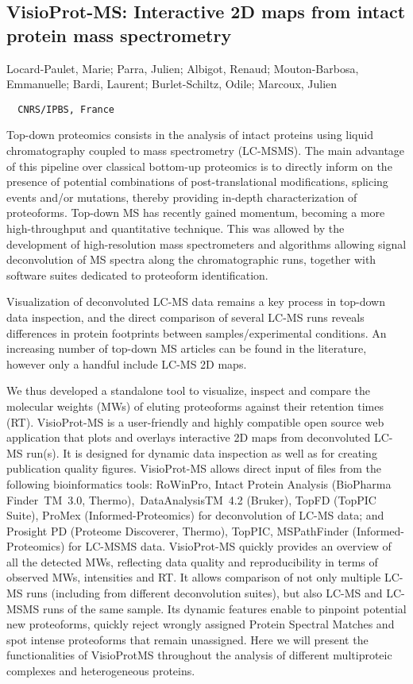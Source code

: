 
{\parindent0pt

\subsection*{\color{eubicRed} VisioProt-MS: Interactive 2D maps from intact protein mass spectrometry}
{\color{eubicGray}Locard-Paulet, Marie;
Parra, Julien;
Albigot, Renaud;
Mouton-Barbosa, Emmanuelle;
Bardi, Laurent;
Burlet-Schiltz, Odile;
Marcoux, Julien}
{\color{eubicGray}\begin{verbatim}
  CNRS/IPBS, France
\end{verbatim}}

Top-down proteomics consists in the analysis of intact proteins using liquid chromatography coupled to mass spectrometry (LC-MSMS). The main advantage of this pipeline over classical bottom-up proteomics is to directly inform on the presence of potential combinations of post-translational modifications, splicing events and/or mutations, thereby providing in-depth characterization of proteoforms. Top-down MS has recently gained momentum, becoming a more high-throughput and quantitative technique. This was allowed by the development of high-resolution mass spectrometers and algorithms allowing signal deconvolution of MS spectra along the chromatographic runs, together with software suites dedicated to proteoform identification.

Visualization of deconvoluted LC-MS data remains a key process in top-down data inspection, and the direct comparison of several LC-MS runs reveals differences in protein footprints between samples/experimental conditions. An increasing number of top-down MS articles can be found in the literature, however only a handful include LC-MS 2D maps.

We thus developed a standalone tool to visualize, inspect and compare the molecular weights (MWs) of eluting proteoforms against their retention times (RT). VisioProt-MS is a user-friendly and highly compatible open source web application that plots and overlays interactive 2D maps from deconvoluted LC-MS run(s). It is designed for dynamic data inspection as well as for creating publication quality figures. VisioProt-MS allows direct input of files from the following bioinformatics tools: RoWinPro, Intact Protein Analysis (BioPharma Finder TM 3.0, Thermo), DataAnalysisTM 4.2 (Bruker), TopFD (TopPIC Suite), ProMex (Informed-Proteomics) for deconvolution of LC-MS data; and Prosight PD (Proteome Discoverer, Thermo), TopPIC, MSPathFinder (Informed-Proteomics) for LC-MSMS data. VisioProt-MS quickly provides an overview of all the detected MWs, reflecting data quality and reproducibility in terms of observed MWs, intensities and RT. It allows comparison of not only multiple LC-MS runs (including from different deconvolution suites), but also LC-MS and LC-MSMS runs of the same sample. Its dynamic features enable to pinpoint potential new proteoforms, quickly reject wrongly assigned Protein Spectral Matches and spot intense proteoforms that remain unassigned. Here we will present the functionalities of VisioProtMS throughout the analysis of different multiproteic complexes and heterogeneous proteins.


}
